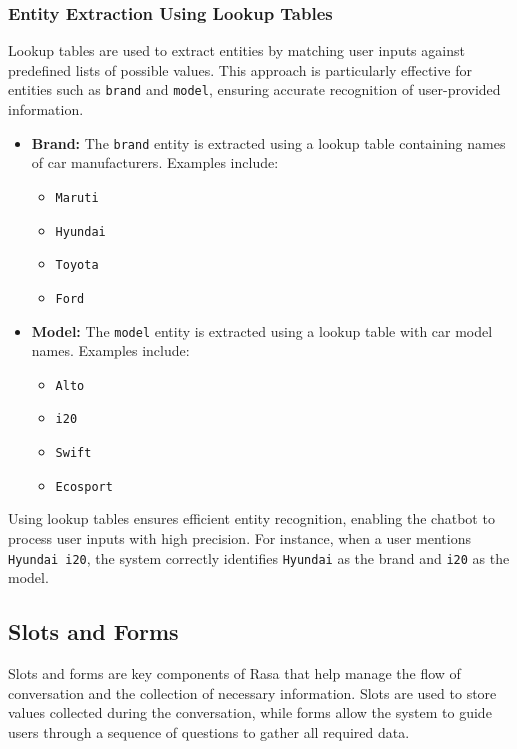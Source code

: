 \documentclass[a4paper,12pt]{article}
\begin{document}
\subsubsection{Entity Extraction Using Lookup Tables}

Lookup tables are used to extract entities by matching user inputs against predefined lists of possible values. This approach is particularly effective for entities such as \texttt{brand} and \texttt{model}, ensuring accurate recognition of user-provided information.

\begin{itemize}
	\item \textbf{Brand:} The \texttt{brand} entity is extracted using a lookup table containing names of car manufacturers. Examples include:
	\begin{itemize}
		\item \texttt{Maruti}
		\item \texttt{Hyundai}
		\item \texttt{Toyota}
		\item \texttt{Ford}
	\end{itemize}
	\item \textbf{Model:} The \texttt{model} entity is extracted using a lookup table with car model names. Examples include:
	\begin{itemize}
		\item \texttt{Alto}
		\item \texttt{i20}
		\item \texttt{Swift}
		\item \texttt{Ecosport}
	\end{itemize}
\end{itemize}

Using lookup tables ensures efficient entity recognition, enabling the chatbot to process user inputs with high precision. For instance, when a user mentions \texttt{Hyundai i20}, the system correctly identifies \texttt{Hyundai} as the brand and \texttt{i20} as the model.


\subsection{Slots and Forms}

Slots and forms are key components of Rasa that help manage the flow of conversation and the collection of necessary information. Slots are used to store values collected during the conversation, while forms allow the system to guide users through a sequence of questions to gather all required data.
\end{document}
